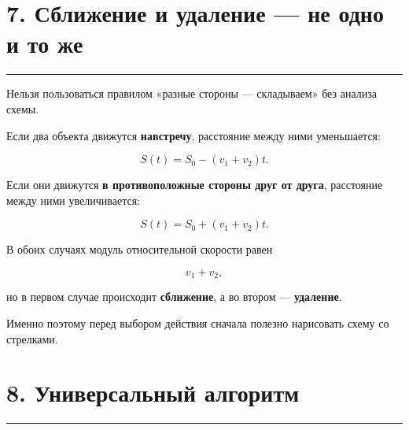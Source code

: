 \documentclass[a4paper,12pt]{article}
\newcommand{\sectionline}{
    \vspace{-0.2em}
    {\color{linegray}\rule{\linewidth}{0.5pt}}
    \vspace{0.5em}
}
\newcommand{\key}[1]{\textcolor{darkaccent}{\textbf{#1}}}
\begin{document}
\section*{\textcolor{darkaccent}{7. Сближение и удаление --- не одно и то же}}

\sectionline

Нельзя пользоваться правилом
«разные стороны --- складываем» без анализа схемы.

Если два объекта движутся \key{навстречу}, расстояние между ними
уменьшается:

\[
S(t)=S_0-(v_1+v_2)t.
\]

Если они движутся \key{в противоположные стороны друг от друга},
расстояние между ними увеличивается:

\[
\boxed{S(t)=S_0+(v_1+v_2)t}.
\]

В обоих случаях модуль относительной скорости равен

\[
v_1+v_2,
\]

но в первом случае происходит \key{сближение}, а во втором ---
\key{удаление}.

Именно поэтому перед выбором действия сначала полезно нарисовать
схему со стрелками.


\section*{\textcolor{darkaccent}{8. Универсальный алгоритм}}

\sectionline
\end{document}
